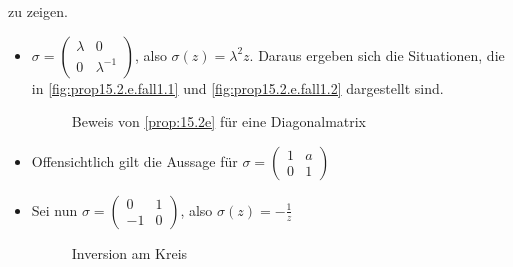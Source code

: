 \begin{beweis}
\begin{enumerate}[label=\alph*)]
              zu zeigen.
            \begin{itemize}
                \item $\sigma = \begin{pmatrix}\lambda & 0\\ 0 & \lambda^{-1}\end{pmatrix}$, also $\sigma(z) = \lambda^2 z$.
                      Daraus ergeben sich die Situationen, die in \cref{fig:prop15.2.e.fall1.1} und
                      \cref{fig:prop15.2.e.fall1.2} dargestellt sind.
                    \begin{figure}[ht]
                        \centering
                        \subfloat[Fall 1]{
                            \resizebox{0.45\linewidth}{!}{}
                            \label{fig:prop15.2.e.fall1.1}
                        }%
                        \label{fig:prop15.2.e.fall1.0}
                        \caption{Beweis von \cref{prop:15.2e} für eine Diagonalmatrix}
                    \end{figure}
                \item Offensichtlich gilt die Aussage für $\sigma = \begin{pmatrix}1 & a\\0 & 1\end{pmatrix}$
                \item Sei nun $\sigma = \begin{pmatrix}0 & 1\\-1 & 0\end{pmatrix}$, also $\sigma(z) = - \frac{1}{z}$
                    \begin{figure}[htp]
                        \centering
                        
                        \caption{Inversion am Kreis}
                        \label{fig:inversion-am-kreis}
                    \end{figure}
            \end{itemize}
    \end{enumerate}
\end{beweis}


